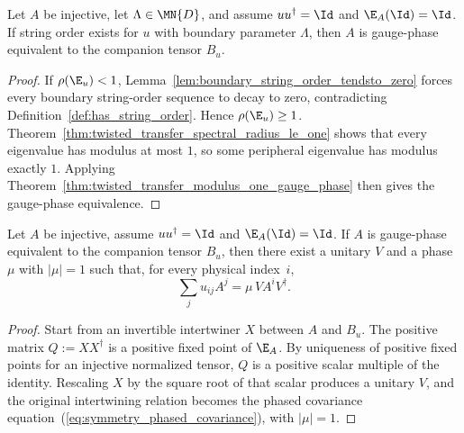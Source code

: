 \begin{theorem}%
    \label{thm:string_order_implies_twisted_gauge_phase}
    \leanok
    Let $A$ be injective, let $\Lambda \in \MN{D}$, and assume
    $u u^\dagger = \Id$ and $\E_A(\Id)=\Id$.
    If string order exists for $u$ with boundary parameter $\Lambda$, then $A$
    is gauge-phase equivalent to the companion tensor $B_u$.
\end{theorem}

\begin{proof}
    \leanok
    If $\rho(\E_u) < 1$, Lemma~\ref{lem:boundary_string_order_tendsto_zero}
    forces every boundary string-order sequence to decay to zero, contradicting
    Definition~\ref{def:has_string_order}.
    Hence $\rho(\E_u) \ge 1$.
    Theorem~\ref{thm:twisted_transfer_spectral_radius_le_one} shows that every
    eigenvalue has modulus at most $1$, so some peripheral eigenvalue has modulus
    exactly $1$.
    Applying Theorem~\ref{thm:twisted_transfer_modulus_one_gauge_phase} then
    gives the gauge-phase equivalence.
\end{proof}

\begin{theorem}%
    \label{thm:virtual_unitary_of_twisted_gauge_phase}
    \leanok
    Let $A$ be injective, assume $u u^\dagger = \Id$ and $\E_A(\Id)=\Id$.
    If $A$ is gauge-phase equivalent to the companion tensor $B_u$, then there
    exist a unitary $V$ and a phase $\mu$ with $|\mu|=1$ such that, for every
    physical index~$i$,
    \begin{equation}\label{eq:symmetry_phased_covariance}
        \sum_j u_{ij} A^j = \mu\, V A^i V^\dagger.
    \end{equation}
\end{theorem}

\begin{proof}
    \leanok
    Start from an invertible intertwiner $X$ between $A$ and $B_u$.
    The positive matrix $Q := X X^\dagger$ is a positive fixed point of
    $\E_A$.
    By uniqueness of positive fixed points for an injective normalized tensor,
    $Q$ is a positive scalar multiple of the identity.
    Rescaling $X$ by the square root of that scalar produces a unitary $V$,
    and the original intertwining relation becomes the phased covariance
    equation~(\ref{eq:symmetry_phased_covariance}), with $|\mu|=1$.
\end{proof}


